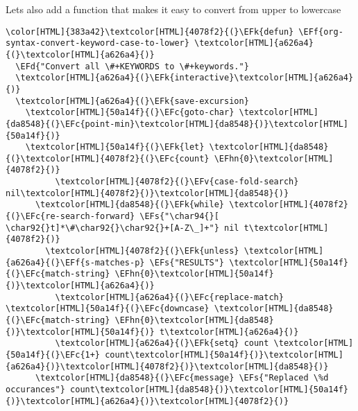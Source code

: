 \documentclass{scrartcl}
\newcommand{\EFk}[1]{\textcolor{EFk}{#1}} %
\newcommand{\EFd}[1]{\textcolor{EFd}{\textit{#1}}} %
\newcommand{\EFs}[1]{\textcolor{EFs}{#1}} %
\newcommand{\EFc}[1]{\textcolor{EFc}{#1}} %
\newcommand{\EFv}[1]{\textcolor{EFv}{#1}} %
\newcommand{\EFf}[1]{\textcolor{EFf}{#1}} %
\newcommand{\EFhn}[1]{\textcolor{EFhn}{\textbf{#1}}} %
\begin{document}
Lets also add a function that makes it easy to convert from upper to lowercase
\begin{Code}
\begin{Verbatim}[]
\color[HTML]{383a42}\textcolor[HTML]{4078f2}{(}\EFk{defun} \EFf{org-syntax-convert-keyword-case-to-lower} \textcolor[HTML]{a626a4}{(}\textcolor[HTML]{a626a4}{)}
  \EFd{"Convert all \#+KEYWORDS to \#+keywords."}
  \textcolor[HTML]{a626a4}{(}\EFk{interactive}\textcolor[HTML]{a626a4}{)}
  \textcolor[HTML]{a626a4}{(}\EFk{save-excursion}
    \textcolor[HTML]{50a14f}{(}\EFc{goto-char} \textcolor[HTML]{da8548}{(}\EFc{point-min}\textcolor[HTML]{da8548}{)}\textcolor[HTML]{50a14f}{)}
    \textcolor[HTML]{50a14f}{(}\EFk{let} \textcolor[HTML]{da8548}{(}\textcolor[HTML]{4078f2}{(}\EFc{count} \EFhn{0}\textcolor[HTML]{4078f2}{)}
          \textcolor[HTML]{4078f2}{(}\EFv{case-fold-search} nil\textcolor[HTML]{4078f2}{)}\textcolor[HTML]{da8548}{)}
      \textcolor[HTML]{da8548}{(}\EFk{while} \textcolor[HTML]{4078f2}{(}\EFc{re-search-forward} \EFs{"\char94{}[ \char92{}t]*\#\char92{}\char92{}+[A-Z\_]+"} nil t\textcolor[HTML]{4078f2}{)}
        \textcolor[HTML]{4078f2}{(}\EFk{unless} \textcolor[HTML]{a626a4}{(}\EFf{s-matches-p} \EFs{"RESULTS"} \textcolor[HTML]{50a14f}{(}\EFc{match-string} \EFhn{0}\textcolor[HTML]{50a14f}{)}\textcolor[HTML]{a626a4}{)}
          \textcolor[HTML]{a626a4}{(}\EFc{replace-match} \textcolor[HTML]{50a14f}{(}\EFc{downcase} \textcolor[HTML]{da8548}{(}\EFc{match-string} \EFhn{0}\textcolor[HTML]{da8548}{)}\textcolor[HTML]{50a14f}{)} t\textcolor[HTML]{a626a4}{)}
          \textcolor[HTML]{a626a4}{(}\EFk{setq} count \textcolor[HTML]{50a14f}{(}\EFc{1+} count\textcolor[HTML]{50a14f}{)}\textcolor[HTML]{a626a4}{)}\textcolor[HTML]{4078f2}{)}\textcolor[HTML]{da8548}{)}
      \textcolor[HTML]{da8548}{(}\EFc{message} \EFs{"Replaced \%d occurances"} count\textcolor[HTML]{da8548}{)}\textcolor[HTML]{50a14f}{)}\textcolor[HTML]{a626a4}{)}\textcolor[HTML]{4078f2}{)}
\end{Verbatim}
\end{Code}
\end{document}
